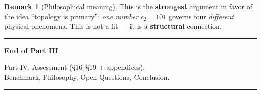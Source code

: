\documentclass[11pt,a4paper]{article}
\theoremstyle{definition}
\newtheorem{remark}[theorem]{Remark}
\begin{document}
\begin{remark}[Philosophical meaning]
\label{rem:unified-c2-philosophy}
This is the \textbf{strongest} argument in favor of the idea 
``topology is primary'': \emph{one number} $c_2 = 101$ 
governs four \emph{different} physical phenomena. 
This is not a fit — it is a \textbf{structural} connection.
\end{remark}


\vfill

\begin{center}
\rule{0.6\textwidth}{0.4pt}

\vspace{0.5cm}

{\large\bfseries End of Part III}

\vspace{0.3cm}

{\small
Part IV. Assessment (§16–§19 + appendices): \\
Benchmark, Philosophy, Open Questions, Conclusion.
}

\vspace{0.5cm}

\rule{0.6\textwidth}{0.4pt}
\end{center}



\vspace{1cm}
\end{document}
